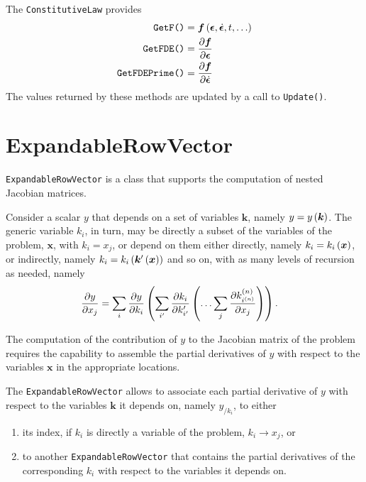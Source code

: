 \documentclass[10pt,fleqn,subeqn]{report}
\newcommand{\T}[1]{\bm{#1}}
\begin{document}
The \texttt{ConstitutiveLaw} provides
\begin{subequations}
\begin{align}
	\texttt{GetF()}
	&=
	\T{f}\plbr{ \T{\epsilon}, \dot{\T{\epsilon}}, t, \ldots }
	\\
	\texttt{GetFDE()}
	&=
	\frac{\partial \T{f}}{\partial \T{\epsilon}}
	\\
	\texttt{GetFDEPrime()}
	&=
	\frac{\partial \T{f}}{\partial \dot{\T{\epsilon}}}
\end{align}
\end{subequations}
The values returned by these methods are updated by a call to
\texttt{Update()}.



\section{ExpandableRowVector}
\texttt{ExpandableRowVector} is a class that supports
the computation of nested Jacobian matrices.

Consider a scalar $y$  that depends on a set of variables $\T{k}$,
namely $y=y\plbr{\T{k}}$.
The generic variable $k_i$, in turn, may be directly a subset of the variables
of the problem, $\T{x}$, with $k_i=x_j$, or depend on them either directly,
namely $k_i=k_i\plbr{\T{x}}$, or indirectly,
namely $k_i=k_i\plbr{\T{k}'\plbr{\T{x}}}$ and so on,
with as many levels of recursion as needed, namely
\begin{align}
	\frac{\partial y}{\partial x_j}
	&=
	\sum_{i} \frac{\partial y}{\partial k_i}\left( 
		\sum_{i'} \frac{\partial k_i}{\partial k'_{i'}}\left( 
			\ldots
			\sum_{j} \frac{\partial k^{(n)}_{i^{(n)}}}{\partial x_j}
		 \right)
	 \right)
	.
\end{align}

The computation of the contribution of $y$ to the Jacobian matrix
of the problem requires the capability to assemble the partial derivatives
of $y$ with respect to the variables $\T{x}$ in the appropriate locations.

The \texttt{ExpandableRowVector} allows to associate each partial derivative
of $y$ with respect to the variables $\T{k}$ it depends on, namely $y_{/k_i}$,
to either 
\begin{enumerate}
\renewcommand{\labelenumi}{\alph{enumi})}
\item its index, if $k_i$ is directly a variable of the problem,
$k_i\rightarrow x_j$, or
\item to another \texttt{ExpandableRowVector} that contains
the partial derivatives of the corresponding $k_i$ with respect
to the variables it depends on.
\end{enumerate}
\end{document}
